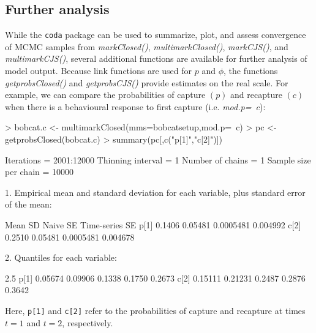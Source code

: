 \documentclass[12pt]{article}
\begin{document}
\subsection{Further analysis}
While the \verb|coda| package can be used to summarize, plot, and assess convergence of MCMC samples from \textit{markClosed()}, \textit{multimarkClosed()}, \textit{markCJS()}, and \textit{multimarkCJS()}, several additional functions are available for further analysis of model output. Because link functions are used for $p$ and $\phi$, the functions \textit{getprobsClosed()} and \textit{getprobsCJS()} provide estimates on the real scale. For example, we can compare the probabilities of capture $(p)$ and recapture $(c)$ when there is a behavioural response to first capture (i.e. \textit{mod.p=~c}):
\begin{Schunk}
\begin{Sinput}
> bobcat.c <- multimarkClosed(mms=bobcatsetup,mod.p=~c)
> pc <- getprobsClosed(bobcat.c)
> summary(pc[,c("p[1]","c[2]")])
\end{Sinput}
\end{Schunk}
\begin{Schunk}
\begin{Soutput}
Iterations = 2001:12000
Thinning interval = 1 
Number of chains = 1 
Sample size per chain = 10000 

1. Empirical mean and standard deviation for each variable,
   plus standard error of the mean:

       Mean      SD  Naive SE Time-series SE
p[1] 0.1406 0.05481 0.0005481       0.004992
c[2] 0.2510 0.05481 0.0005481       0.004678

2. Quantiles for each variable:

        2.5%
p[1] 0.05674 0.09906 0.1338 0.1750 0.2673
c[2] 0.15111 0.21231 0.2487 0.2876 0.3642
\end{Soutput}
\end{Schunk}
Here, \verb|p[1]| and \verb|c[2]| refer to the probabilities of capture and recapture at times $t=1$ and $t=2$, respectively.
\end{document}
